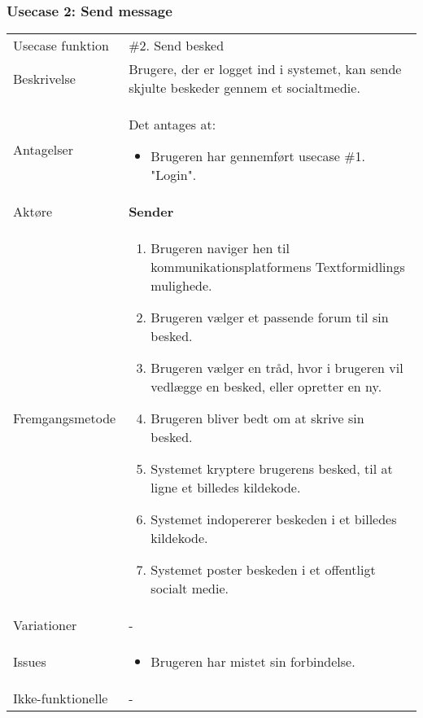 \subsubsection{Usecase 2: Send message \label{Usecase2_Send_Message}}
\begin{tabular}{@{}p{3.5cm}@{}p{13cm}@{}}
    Usecase funktion & 
    \#2. Send besked \\
    Beskrivelse & 
    Brugere, der er logget ind i systemet, kan sende skjulte beskeder gennem et socialtmedie. \\
    Antagelser & 
    Det antages at:
    \begin{itemize}
        \item Brugeren har gennemført usecase \#1. "Login".
    \end{itemize}\\
    Aktøre & 
    \textbf{Sender} \\
    Fremgangsmetode &
    \begin{enumerate}
        \item Brugeren naviger hen til kommunikationsplatformens Textformidlings mulighede.
        \item Brugeren vælger et passende forum til sin besked.
        \item Brugeren vælger en tråd, hvor i brugeren vil vedlægge en besked, eller opretter en ny.
        \item Brugeren bliver bedt om at skrive sin besked.
        \item Systemet kryptere brugerens besked, til at ligne et billedes kildekode.
        \item Systemet indopererer beskeden i et billedes kildekode.
        \item Systemet poster beskeden i et offentligt socialt medie.
    \end{enumerate} \\
    Variationer & 
    - \\
    Issues &
    \begin{itemize}
        \item Brugeren har mistet sin forbindelse.
    \end{itemize}\\
    Ikke-funktionelle & 
    -
\end{tabular}
